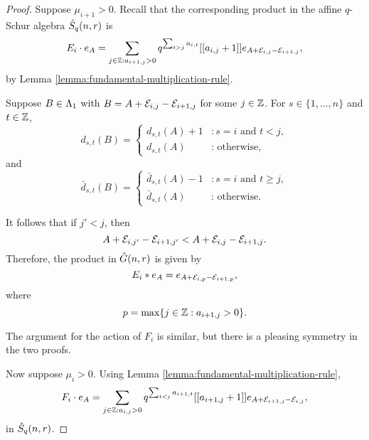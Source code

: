 \documentclass[a4paper, 11pt]{report}
\begin{document}
\begin{proof}
Suppose $\mu_{i+1}>0$. Recall that the corresponding product in the affine $q$-Schur algebra $\hat{S}_q(n,r)$ is
\begin{equation*}
E_i\cdot e_A = \sum_{j\in\mathbb{Z}:a_{i+1,j}>0} q^{\sum_{t>j} a_{i,t}}[[a_{i,j}+1]]e_{A+\mathcal{E}_{i,j}-\mathcal{E}_{i+1,j}},
\end{equation*}
by Lemma \ref{lemma:fundamental-multiplication-rule}.

Suppose $B\in\Lambda_1{}$ with $B=A+\mathcal{E}_{i,j}-\mathcal{E}_{i+1,j}$ for some $j\in\mathbb{Z}$. For $s\in\{1,\ldots,n\}$ and $t\in\mathbb{Z}$,
\begin{equation*}
d_{s,t}{(B)} = \begin{cases}
d_{s,t}{(A)} + 1 &: s=i \text{ and } t<j,\\
d_{s,t}{(A)} &: \text{ otherwise,}
\end{cases}
\end{equation*}
and
\begin{equation*}
\bar{d}_{s,t}{(B)} = \begin{cases}
\bar{d}_{s,t}{(A)} - 1 &: s=i \text{ and } t\geq j,\\
\bar{d}_{s,t}{(A)} &: \text{ otherwise.}
\end{cases}
\end{equation*}

It follows that if $j'<j$, then
\begin{equation*}
A+\mathcal{E}_{i,j'}-\mathcal{E}_{i+1,j'} < A+\mathcal{E}_{i,j}-\mathcal{E}_{i+1,j}.
\end{equation*}
Therefore, the product in $\hat{G}(n,r)$ is given by
\begin{equation*}
E_i\ast e_A = e_{A+\mathcal{E}_{i,p}-\mathcal{E}_{i+1,p}},
\end{equation*}
where
\begin{equation*}
p=\max\{j\in\mathbb{Z}:a_{i+1,j}>0\}.
\end{equation*}

The argument for the action of $F_i$ is similar, but there is a pleasing symmetry in the two proofs.

Now suppose $\mu_{i}>0$. Using Lemma \ref{lemma:fundamental-multiplication-rule},
\begin{equation*}
F_i\cdot e_A = \sum_{j\in\mathbb{Z}:a_{i,j}>0} q^{\sum_{t<j} a_{i+1,t}}[[a_{i+1,j}+1]] e_{A+\mathcal{E}_{i+1,j}-\mathcal{E}_{i,j}},
\end{equation*}
in $\hat{S}_q(n,r)$. 


\end{proof}
\end{document}

